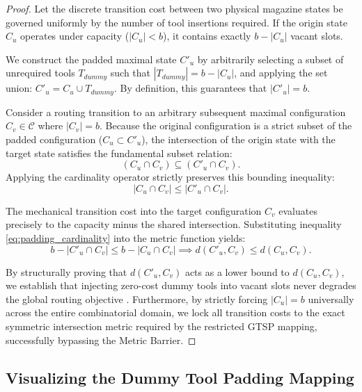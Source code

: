 \documentclass[11pt, a4paper]{book}
\begin{document}
	\begin{proof}
		Let the discrete transition cost between two physical magazine states be governed uniformly by the number of tool insertions required. If the origin state $C_u$ operates under capacity ($|C_u| < b$), it contains exactly $b - |C_u|$ vacant slots. 
		
		We construct the padded maximal state $C'_u$ by arbitrarily selecting a subset of unrequired tools $T_{dummy}$ such that $|T_{dummy}| = b - |C_u|$, and applying the set union: $C'_u = C_u \cup T_{dummy}$. By definition, this guarantees that $|C'_u| = b$. %
		
		Consider a routing transition to an arbitrary subsequent maximal configuration $C_v \in \mathcal{C}$ where $|C_v| = b$. Because the original configuration is a strict subset of the padded configuration ($C_u \subset C'_u$), the intersection of the origin state with the target state satisfies the fundamental subset relation:
		\begin{equation}
			(C_u \cap C_v) \subseteq (C'_u \cap C_v).
		\end{equation}
		Applying the cardinality operator strictly preserves this bounding inequality:
		\begin{equation}
			|C_u \cap C_v| \le |C'_u \cap C_v|. \label{eq:padding_cardinality}
		\end{equation}
		
		The mechanical transition cost into the target configuration $C_v$ evaluates precisely to the capacity minus the shared intersection. Substituting inequality \eqref{eq:padding_cardinality} into the metric function yields:
		\begin{equation}
			b - |C'_u \cap C_v| \le b - |C_u \cap C_v| \implies d(C'_u, C_v) \le d(C_u, C_v).
		\end{equation}
		
		By structurally proving that $d(C'_u, C_v)$ acts as a lower bound to $d(C_u, C_v)$, we establish that injecting zero-cost dummy tools into vacant slots never degrades the global routing objective %
		. Furthermore, by strictly forcing $|C_u| = b$ universally across the entire combinatorial domain, we lock all transition costs to the exact symmetric intersection metric required by the restricted GTSP mapping, successfully bypassing the Metric Barrier.
	\end{proof}
	
	\subsection{Visualizing the Dummy Tool Padding Mapping}
	
\end{document}
